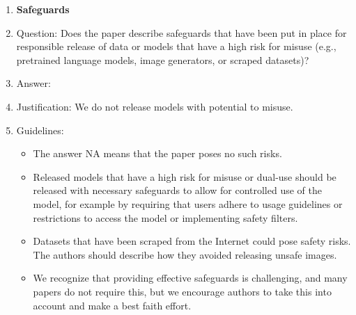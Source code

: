 \documentclass{article}
\begin{document}
\begin{enumerate}
\item {\bf Safeguards}
    \item[] Question: Does the paper describe safeguards that have been put in place for responsible release of data or models that have a high risk for misuse (e.g., pretrained language models, image generators, or scraped datasets)?
    \item[] Answer: \answerNA{} %
    \item[] Justification: We do not release models with potential to misuse.
    \item[] Guidelines:
    \begin{itemize}
        \item The answer NA means that the paper poses no such risks.
        \item Released models that have a high risk for misuse or dual-use should be released with necessary safeguards to allow for controlled use of the model, for example by requiring that users adhere to usage guidelines or restrictions to access the model or implementing safety filters. 
        \item Datasets that have been scraped from the Internet could pose safety risks. The authors should describe how they avoided releasing unsafe images.
        \item We recognize that providing effective safeguards is challenging, and many papers do not require this, but we encourage authors to take this into account and make a best faith effort.
    \end{itemize}


\end{enumerate}
\end{document}
